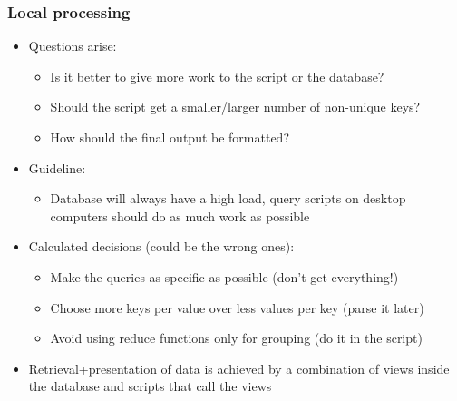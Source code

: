 \documentclass{beamer}
\begin{document}
\begin{frame}[t, fragile]
\frametitle{Local processing}
\begin{itemize}
\item Questions arise:
\begin{itemize}
	\item Is it better to give more work to the script or the database?
	\item Should the script get a smaller/larger number of non-unique keys?
	\item How should the final output be formatted?
\end{itemize}
 \item Guideline:
\begin{itemize}
	\item Database will always have a high load, query scripts on desktop computers should do as much work as possible
\end{itemize}
 \item Calculated decisions (could be the wrong ones):
\begin{itemize}
	\item Make the queries as specific as possible (don't get everything!)
	\item Choose more keys per value over less values per key (parse it later)
	\item Avoid using reduce functions only for grouping (do it in the script)
\end{itemize}
 \item Retrieval+presentation of data is achieved by a combination of views inside the database and scripts that call the views
\end{itemize}
\end{frame}
\end{document}
